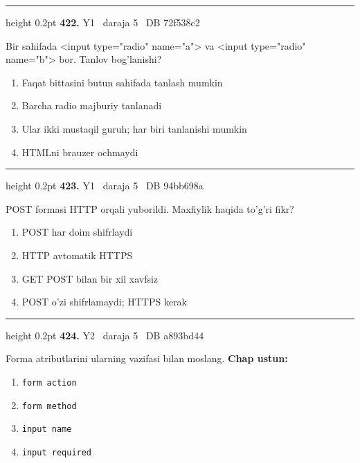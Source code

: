 \documentclass[10pt,a4paper,oneside]{article}
\begin{document}
\vspace{2mm}\hrule height 0.2pt \vspace{4mm}
\hypertarget{q422}{\textbf{\color{ink}422.}}  {\color{muted}\scriptsize Y1 \textbullet\ daraja 5 \textbullet\ DB 72f538c2}
\par
Bir sahifada \textless{}input type="radio" name="a"\textgreater{} va \textless{}input type="radio" name="b"\textgreater{} bor. Tanlov bog'lanishi?
\begin{enumerate}[label=\Alph*),leftmargin=9mm]
\item Faqat bittasini butun sahifada tanlash mumkin
\item Barcha radio majburiy tanlanadi
\item Ular ikki mustaqil guruh; har biri tanlanishi mumkin
\item HTMLni brauzer ochmaydi
\end{enumerate}
\vspace{2mm}\hrule height 0.2pt \vspace{4mm}
\hypertarget{q423}{\textbf{\color{ink}423.}}  {\color{muted}\scriptsize Y1 \textbullet\ daraja 5 \textbullet\ DB 94bb698a}
\par
POST formasi HTTP orqali yuborildi. Maxfiylik haqida to'g'ri fikr?
\begin{enumerate}[label=\Alph*),leftmargin=9mm]
\item POST har doim shifrlaydi
\item HTTP avtomatik HTTPS
\item GET POST bilan bir xil xavfsiz
\item POST o'zi shifrlamaydi; HTTPS kerak
\end{enumerate}
\vspace{2mm}\hrule height 0.2pt \vspace{4mm}
\hypertarget{q424}{\textbf{\color{ink}424.}}  {\color{muted}\scriptsize Y2 \textbullet\ daraja 5 \textbullet\ DB a893bd44}
\par
Forma atributlarini ularning vazifasi bilan moslang.
\textbf{\footnotesize Chap ustun:}
\begin{enumerate}[label=\arabic*),leftmargin=9mm]
\item \texttt{form action}
\item \texttt{form method}
\item \texttt{input name}
\item \texttt{input required}
\end{enumerate}
\end{document}
